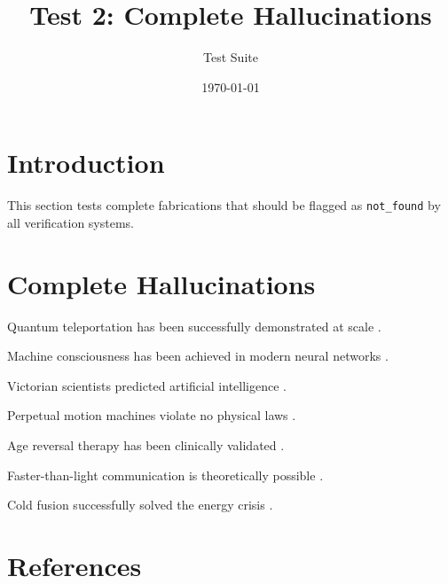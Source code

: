 \documentclass{article}
\title{Test 2: Complete Hallucinations}
\author{Test Suite}
\date{\today}
\begin{document}
\section{Introduction}

This section tests complete fabrications that should be flagged as \texttt{not\_found} by all verification systems.

\section{Complete Hallucinations}

Quantum teleportation has been successfully demonstrated at scale \cite{Smith2024Quantum}.

Machine consciousness has been achieved in modern neural networks \cite{Johnson2023Consciousness}.

Victorian scientists predicted artificial intelligence \cite{Newton1850Victorian}.

Perpetual motion machines violate no physical laws \cite{Thompson2024Perpetual}.

Age reversal therapy has been clinically validated \cite{Goldman2023Aging}.

Faster-than-light communication is theoretically possible \cite{Williams2024FTL}.

Cold fusion successfully solved the energy crisis \cite{Brown2023ColdFusion}.

\section{References}
\end{document}
